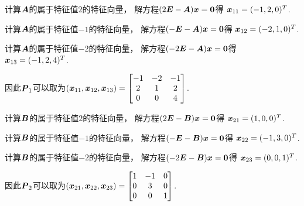 \begin{example}
\begin{solution}
计算\(\boldsymbol{A}\)的属于特征值\(2\)的特征向量，
解方程\((2\boldsymbol{E}-\boldsymbol{A}) \boldsymbol{x} = \boldsymbol0\)得
\(\boldsymbol{x}_{11} = (-1,2,0)^T\).

计算\(\boldsymbol{A}\)的属于特征值\(-1\)的特征向量，
解方程\((-\boldsymbol{E}-\boldsymbol{A}) \boldsymbol{x} = \boldsymbol0\)得
\(\boldsymbol{x}_{12} = (-2,1,0)^T\).

计算\(\boldsymbol{A}\)的属于特征值\(-2\)的特征向量，
解方程\((-2\boldsymbol{E}-\boldsymbol{A}) \boldsymbol{x} = \boldsymbol0\)得
\(\boldsymbol{x}_{13} = (-1,2,4)^T\).

因此\(\boldsymbol{P}_1\)可以取为\(
	(\boldsymbol{x}_{11},\boldsymbol{x}_{12},\boldsymbol{x}_{13})
	= \begin{bmatrix}
		-1 & -2 & -1 \\
		2 & 1 & 2 \\
		0 & 0 & 4
	\end{bmatrix}
\).

计算\(\boldsymbol{B}\)的属于特征值\(2\)的特征向量，
解方程\((2\boldsymbol{E}-\boldsymbol{B}) \boldsymbol{x} = \boldsymbol0\)得
\(\boldsymbol{x}_{21} = (1,0,0)^T\).

计算\(\boldsymbol{B}\)的属于特征值\(-1\)的特征向量，
解方程\((-\boldsymbol{E}-\boldsymbol{B}) \boldsymbol{x} = \boldsymbol0\)得
\(\boldsymbol{x}_{22} = (-1,3,0)^T\).

计算\(\boldsymbol{B}\)的属于特征值\(-2\)的特征向量，
解方程\((-2\boldsymbol{E}-\boldsymbol{B}) \boldsymbol{x} = \boldsymbol0\)得
\(\boldsymbol{x}_{23} = (0,0,1)^T\).

因此\(\boldsymbol{P}_2\)可以取为\(
	(\boldsymbol{x}_{21},\boldsymbol{x}_{22},\boldsymbol{x}_{23})
	= \begin{bmatrix}
		1 & -1 & 0 \\
		0 & 3 & 0 \\
		0 & 0 & 1
	\end{bmatrix}
\).


\end{solution}
\end{example}
